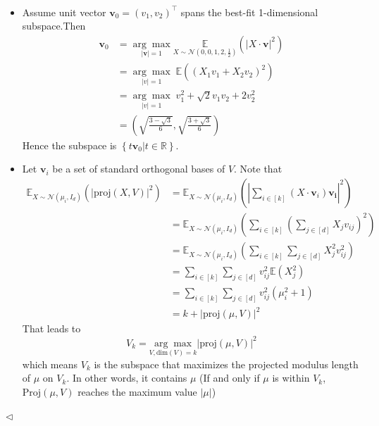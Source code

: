 \documentclass[11pt]{article}
\newenvironment{answer}[1][Answer]{\begin{trivlist}
\item[\hskip \labelsep {\bfseries #1.}\hskip \labelsep]}{\hfill$\lhd$\end{trivlist}}
\begin{document}
\begin{answer}~
\begin{itemize}
    \item [(1)]Assume unit vector $\boldsymbol{v}_0=(v_1,v_2)^\top$ spans the best-fit 1-dimensional subspace.Then
$$\begin{align*}\boldsymbol{v}_0&=\underset{|\boldsymbol{v}|=1}{\arg 
\max} \underset{X \sim\mathcal{N}\left(0,0,1,2,\frac{1}{2}\right)}{\mathbb E}(|X\cdot \boldsymbol{v}|^2)\\&=\underset{|v|=1}{\arg \max} \;{\mathbb E}((X_1v_1+X_2v_2)^2)\\&=\underset{|v|=1}{\arg \max}\; v_1^2+\sqrt{2}v_1v_2+2v_2^2\\&=\left(\sqrt{\frac{3-\sqrt{3}}{6}},\sqrt{\frac{3+\sqrt{3}}{6}}\right)\end{align*}$$ 
Hence the subspace is $\left\{t\boldsymbol{v}_0\big|t\in \mathbb R\right\}$.
    \item [(2)]
Let $\boldsymbol{v}_i$ be a set of standard orthogonal bases of $V$. Note that
$$\begin{align*}\mathbb E_{X\sim \mathcal{N}(\mu_i,I_d)}(|\mathrm{proj}(X,V)|^2)&=\mathbb E_{X\sim \mathcal{N}(\mu_i,I_d)}\left(|\sum_{i\in [k]}(X\cdot\boldsymbol{v}_i)\boldsymbol{v_i}|^2\right)\\&=\mathbb E_{X\sim \mathcal{N}(\mu_i,I_d)}\left(\sum_{i\in [k]}\left(\sum_{j\in [d]}X_jv_{ij}\right)^2\right)\\&=\mathbb E_{X\sim \mathcal{N}(\mu_i,I_d)}\left(\sum_{i\in [k]}\sum_{j\in [d]}X_j^2v_{ij}^2\right)\\&=\sum_{i\in [k]}\sum_{j\in [d]}v_{ij}^2\mathbb E(X_j^2)\\&=\sum_{i\in [k]}\sum_{j\in [d]}v_{ij}^2(\mu_i^2+1)\\&=k+|\mathrm{proj}(\mu,V)|^2\end{align*}$$
That leads to
$$V_k=\underset{V,\mathrm{dim}(V)=k}{\arg\max}|\mathrm{proj}(\mu,V)|^2$$
which means $V_k$ is the subspace that maximizes the projected modulus length of $\mu$ on $V_k$. In other words, it contains $\mu$ (If and only if $\mu$ is within $V_k$, $\mathrm{Proj}(\mu,V)$ reaches the maximum value $|\mu|$)
\end{itemize}
    
\end{answer}
\end{document}
